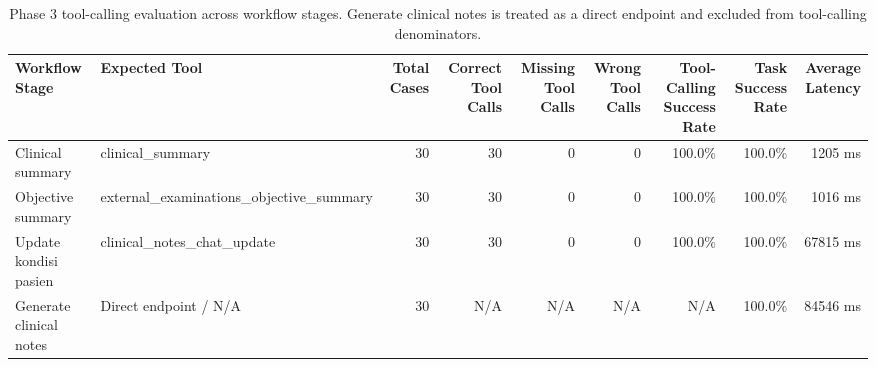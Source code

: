 \begin{table}[htbp]
\centering
\small
\begin{tabular}{l l r r r r r r r}
\hline
Workflow Stage & Expected Tool & Total Cases & Correct Tool Calls & Missing Tool Calls & Wrong Tool Calls & Tool-Calling Success Rate & Task Success Rate & Average Latency \\
\hline
Clinical summary & clinical\_summary & 30 & 30 & 0 & 0 & 100.0\% & 100.0\% & 1205 ms \\
Objective summary & external\_examinations\_objective\_summary & 30 & 30 & 0 & 0 & 100.0\% & 100.0\% & 1016 ms \\
Update kondisi pasien & clinical\_notes\_chat\_update & 30 & 30 & 0 & 0 & 100.0\% & 100.0\% & 67815 ms \\
Generate clinical notes & Direct endpoint / N/A & 30 & N/A & N/A & N/A & N/A & 100.0\% & 84546 ms \\
\hline
\end{tabular}
\caption{Phase 3 tool-calling evaluation across workflow stages. Generate clinical notes is treated as a direct endpoint and excluded from tool-calling denominators.}
\label{tab:phase3-tool-calling}
\end{table}
